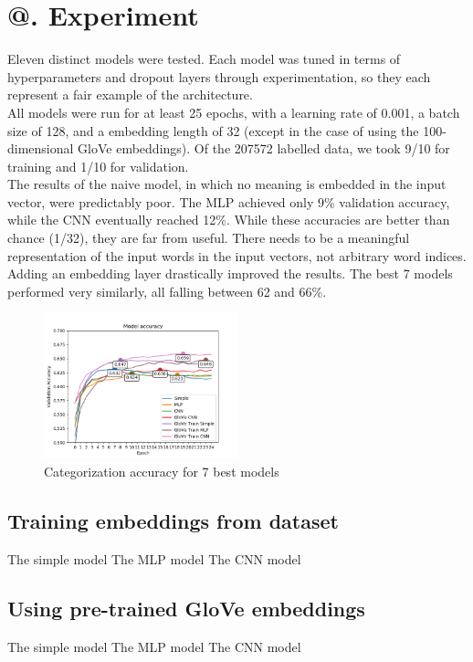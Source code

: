 \documentclass[jou,apacite, 10px]{apa6}
\makeatletter
\newcommand*{\rom}[1]{\expandafter\@slowromancap\romannumeral #1@}
\makeatother
\begin{document}
\section{\rom{5}. Experiment}
Eleven distinct models were tested. Each model was tuned in terms of hyperparameters and dropout layers through experimentation, so they each represent a fair example of the architecture.\\
All models were run for at least 25 epochs, with a learning rate of 0.001, a batch size of 128, and a embedding length of 32 (except in the case of using the 100-dimensional GloVe embeddings). Of the 207572 labelled data, we took 9/10 for training and 1/10 for validation.\\
The results of the naive model, in which no meaning is embedded in the input vector, were predictably poor. The MLP achieved only 9\% validation accuracy, while the CNN eventually reached 12\%. While these accuracies are better than chance (1/32), they are far from useful. There needs to be a meaningful representation of the input words in the input vectors, not arbitrary word indices.\\
Adding an embedding layer drastically improved the results. The best 7 models performed very similarly, all falling between 62 and 66\%.
\begin{figure}[h!]
    \centering
     \includegraphics[width=0.5\textwidth]{images/good_models_comparison_small}
        \caption{Categorization accuracy for 7 best models}
\end{figure}


\subsection{Training embeddings from dataset}
The simple model
The MLP model
The CNN model

\subsection {Using pre-trained GloVe embeddings}
The simple model
The MLP model
The CNN model
\end{document}
